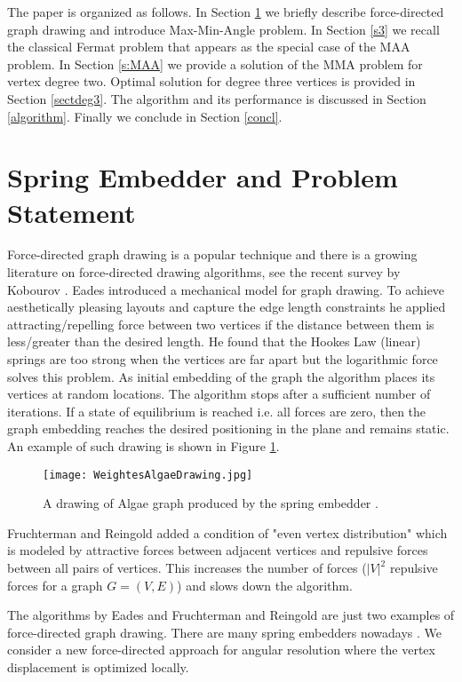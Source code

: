 \documentclass[10pt]{article}
\begin{document}
The paper is organized as follows.
In Section \ref{s2} we briefly describe force-directed graph drawing and introduce Max-Min-Angle problem. In Section \ref{s3} we recall the classical Fermat problem that appears as the special case of the MAA problem. In Section \ref{s:MAA} we provide a solution of the MMA problem for vertex degree two. 
Optimal solution for degree three vertices is provided in Section \ref{sectdeg3}. 
The algorithm and its performance is discussed in Section \ref{algorithm}.
Finally we conclude in Section \ref{concl}.


\section{Spring Embedder and Problem Statement} \label{s2}

Force-directed graph drawing is a popular technique and there is a growing literature on 
force-directed drawing algorithms, see the recent survey by Kobourov \cite{k-fdda-12}.
Eades \cite{EA84} introduced a mechanical model for graph drawing. 
To achieve aesthetically pleasing layouts and capture the edge length constraints he applied 
attracting/repelling force between two vertices if the distance between them is less/greater than the desired length. He found that the Hookes Law (linear) springs 
are too strong when the vertices are far apart but the logarithmic force solves this problem.
As initial embedding of the graph the algorithm places its vertices at random locations. 
The algorithm stops after a sufficient number of iterations. 
If a state of equilibrium is reached i.e. all forces are zero, then the graph embedding reaches 
the desired positioning in the plane and remains static. An example of such drawing is shown in Figure \ref{fig:algae}.

\begin{figure}[htp]
\centering
\texttt{[image: WeightesAlgaeDrawing.jpg]}
\caption{A drawing of Algae graph \cite{pb-opn-12} produced by the spring embedder \cite{embedder}.}
\label{fig:algae}
\end{figure}

Fruchterman and Reingold \cite{ft91} added a condition of "even vertex distribution" which is modeled  by attractive forces between adjacent vertices and repulsive forces between all pairs of vertices. This increases the number of forces ($|V|^2$ repulsive forces for a graph $G=(V,E)$) and slows down the algorithm.

The algorithms by Eades  \cite{EA84} and Fruchterman and Reingold \cite{ft91} are just two examples of force-directed graph drawing. There are many spring embedders nowadays \cite{k-fdda-12}. 
We consider a new force-directed approach for angular resolution where the vertex displacement is optimized locally. 
\end{document}
